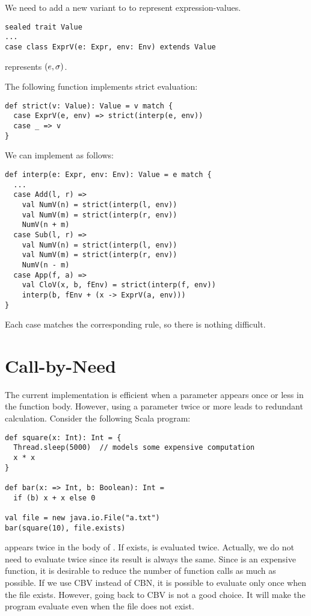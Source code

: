 We need to add a new variant to  to represent expression-values.

\begin{verbatim}
sealed trait Value
...
case class ExprV(e: Expr, env: Env) extends Value
\end{verbatim}

 represents $(e,\sigma)$.

The following function implements strict evaluation:

\begin{verbatim}
def strict(v: Value): Value = v match {
  case ExprV(e, env) => strict(interp(e, env))
  case _ => v
}
\end{verbatim}

We can implement  as follows:

\begin{verbatim}
def interp(e: Expr, env: Env): Value = e match {
  ...
  case Add(l, r) =>
    val NumV(n) = strict(interp(l, env))
    val NumV(m) = strict(interp(r, env))
    NumV(n + m)
  case Sub(l, r) =>
    val NumV(n) = strict(interp(l, env))
    val NumV(m) = strict(interp(r, env))
    NumV(n - m)
  case App(f, a) =>
    val CloV(x, b, fEnv) = strict(interp(f, env))
    interp(b, fEnv + (x -> ExprV(a, env)))
}
\end{verbatim}

Each case matches the corresponding rule, so there is nothing difficult.

\section{Call-by-Need}

The current implementation is efficient when a parameter appears once or less in
the function body. However, using a parameter twice or more leads to redundant
calculation. Consider the following Scala program:

\begin{verbatim}
def square(x: Int): Int = {
  Thread.sleep(5000)  // models some expensive computation
  x * x
}

def bar(x: => Int, b: Boolean): Int =
  if (b) x + x else 0

val file = new java.io.File("a.txt")
bar(square(10), file.exists)
\end{verbatim}

 appears twice in the body of . If  exists,  is
evaluated twice. Actually, we do not need to evaluate  twice
since its result is always the same. Since  is an expensive
function, it is desirable to reduce the number of function calls as much as possible.
If we use CBV instead of CBN, it is possible to evaluate  only
once when the file exists.
However, going back to CBV is not a good choice. It will make the program
evaluate  even when the file does not exist.

